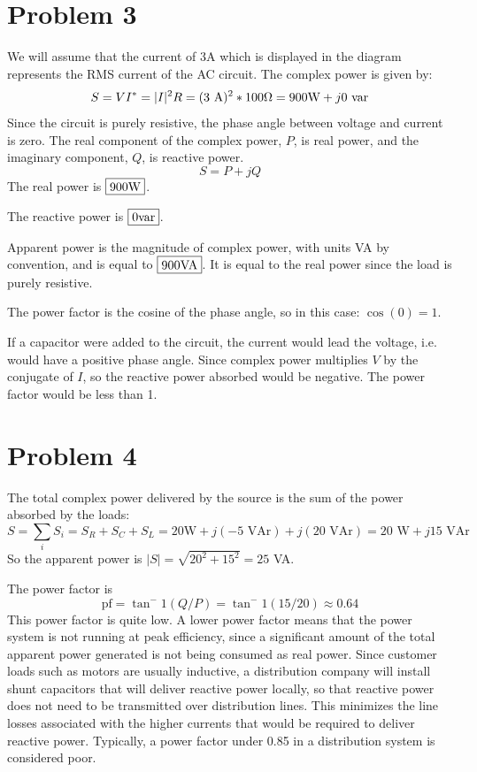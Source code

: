 \documentclass{homework}
\begin{document}
\section{Problem 3}
We will assume that the current of 3A which is displayed in the diagram
represents the RMS current of the AC circuit. The complex power is given by:
\begin{equation}
    S = VI^* = |I|^2 R = (3\text{ A})^2 * 100 \ohm = 900 \text{W} + j0 \text{ var}
\end{equation}
Since the circuit is purely resistive, the phase angle between voltage and current
is zero. The real component of the complex power, $P$, is real power, and the imaginary
component, $Q$, is reactive power.
\begin{equation}
    S = P + jQ
\end{equation}
The real power is $\boxed{$900W$}$.

\noindent The reactive power is $\boxed{$0var$}$.

\noindent Apparent power is the magnitude of complex power, with units VA by convention,
and is equal to $\boxed{$900VA$}$. It is equal to the real power since the load is purely
resistive.

\noindent The power factor is the cosine of the phase angle, so in this case: $\cos(0) = 1$.


If a capacitor were added to the circuit, the current would lead the voltage,
i.e. would have a positive phase angle.
Since complex power multiplies $V$ by the conjugate of $I$, so the reactive
power absorbed would be negative. The power factor would be less than 1.

\section{Problem 4}

The total complex power delivered by the source is the sum of the power
absorbed by the loads:
\begin{equation}
    S = \sum_i S_i = S_R + S_C + S_L = 20 \text{W} + j(-5 \text{ VAr})
        + j(20 \text{ VAr}) = 20 \text{ W} + j15 \text{ VAr}
\end{equation}
So the apparent power is $|S| = \sqrt{20^2 + 15^2} = 25$ VA.

The power factor is
\begin{equation}
    \text{pf} = \tan^-1(Q / P) = \tan^-1(15/20) \approx 0.64
\end{equation}
This power factor is quite low. A lower power
factor means that the power system is not running at peak efficiency, since
a significant amount of the total apparent power generated is not being
consumed as real power. Since customer loads such as motors are usually
inductive, a distribution company will install shunt capacitors that will 
deliver reactive power locally, so that reactive power does not need to
be transmitted over distribution lines. This minimizes the line losses
associated with the higher currents that would be required to deliver reactive
power. Typically, a power factor under 0.85 in a distribution system 
is considered poor.
\end{document}
